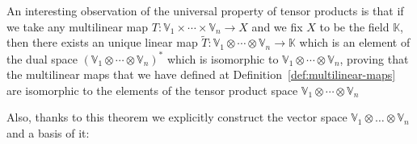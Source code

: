 \documentclass[11pt,a4paper,openright,oneside]{book}
\numberwithin{equation}{section}
\newcommand{\defref}[1]{Definition~\ref{#1}}
\begin{document}
An interesting observation of the universal property of tensor products is that if we take any multilinear map ${T: \mathbb{V}_1 \times \cdots \times \mathbb{V}_n \rightarrow X}$
and we fix $X$ to be the field $\mathbb{K}$, then there exists an unique linear map $\tilde T: \mathbb{V}_1 \otimes \cdots \otimes \mathbb{V}_n \rightarrow \mathbb{K}$
which is an element of the dual space $(\mathbb{V}_1 \otimes \cdots \otimes \mathbb{V}_n)^*$ which is isomorphic to $\mathbb{V}_1 \otimes \cdots \otimes \mathbb{V}_n$, proving
that the multilinear maps that we have defined at \defref{def:multilinear-maps} are isomorphic to the elements of the tensor product space
$\mathbb{V}_1 \otimes \cdots \otimes \mathbb{V}_n$

Also, thanks to this theorem we explicitly construct the vector space ${\mathbb{V}_1 \otimes \dots \otimes \mathbb{V}_n}$ and a
basis of it:
\end{document}
